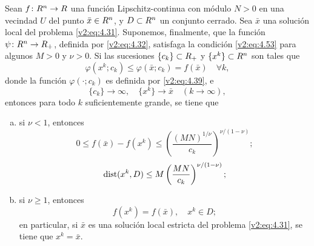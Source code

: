 \begin{theorem}\label{v2:thm:4.3.3}
    Sean $f \colon R^n \to R$ una función Lipschitz-continua con módulo $N > 0$ en una vecindad $U$ del punto $\bar{x} \in R^n$, y $D \subset R^n$ un conjunto cerrado. Sea $\bar{x}$ una solución local del problema \eqref{v2:eq:4.31}. Suponemos, finalmente, que la función $\psi \colon R^n \to R_+$, definida por \eqref{v2:eq:4.32}, satisfaga la condición \eqref{v2:eq:4.53} para algunos $M > 0$ y $\nu > 0$.
    Si las sucesiones $\{c_k\} \subset R_+$ y $\{x^k\} \subset R^n$ son tales que
    \begin{equation}
        \varphi(x^k; c_k) \le \varphi(\bar{x}; c_k) = f(\bar{x}) \quad \forall k,
        \label{v2:eq:4.54}
    \end{equation}
    donde la función $\varphi(\cdot; c_k)$ es definida por \eqref{v2:eq:4.39}, e
    \begin{equation}
        \{c_k\} \to \infty, \quad \{x^k\} \to \bar{x} \quad (k \to \infty),
        \label{v2:eq:4.55}
    \end{equation}
    entonces para todo $k$ suficientemente grande, se tiene que
    \begin{enumerate}[(a)]
        \item si $\nu < 1$, entonces
        \begin{equation}
            0 \le f(\bar{x}) - f(x^k) \le \left( \frac{(MN)^{1/\nu}}{c_k} \right)^{\nu/(1-\nu)};
            \label{v2:eq:4.56}
        \end{equation}
        \begin{equation}
            \operatorname{dist}(x^k, D) \le M \left( \frac{MN}{c_k} \right)^{\nu/(1-\nu)};
            \label{v2:eq:4.57}
        \end{equation}
        \item si $\nu \ge 1$, entonces
        \[
            f(x^k) = f(\bar{x}), \quad x^k \in D;
        \]
        en particular, si $\bar{x}$ es una solución local estricta del problema \eqref{v2:eq:4.31}, se tiene que $x^k = \bar{x}$.
    \end{enumerate}
\end{theorem}
